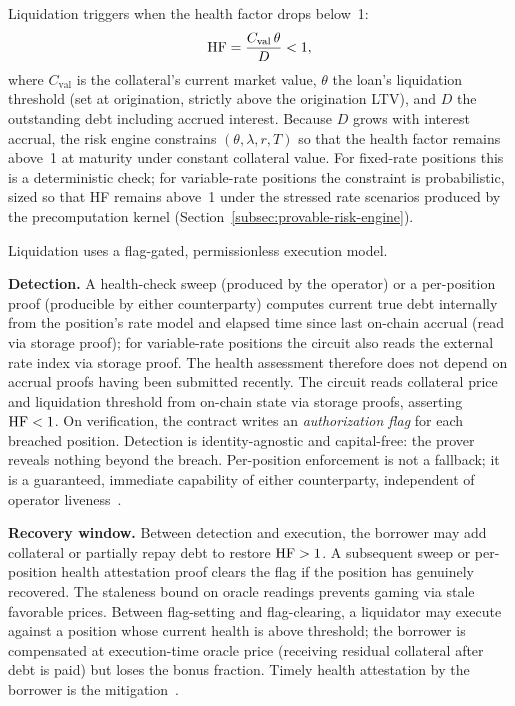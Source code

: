 Liquidation triggers when the health factor drops below~1:
\begin{equation}
  \mathrm{HF} = \frac{C_{\mathrm{val}}\,\theta}{D} < 1,
  \label{eq:healthfactor}
\end{equation}
where $C_{\mathrm{val}}$ is the collateral's current market value, $\theta$ the loan's liquidation threshold (set at origination, strictly above the origination LTV), and $D$ the outstanding debt including accrued interest. Because $D$ grows with interest accrual, the risk engine constrains $(\theta, \lambda, r, T)$ so that the health factor remains above~1 at maturity under constant collateral value. For fixed-rate positions this is a deterministic check; for variable-rate positions the constraint is probabilistic, sized so that HF remains above~1 under the stressed rate scenarios produced by the precomputation kernel (Section~\ref{subsec:provable-risk-engine}).

Liquidation uses a flag-gated, permissionless execution model.

\textbf{Detection.} A health-check sweep (produced by the operator) or a per-position proof (producible by either counterparty) computes current true debt internally from the position's rate model and elapsed time since last on-chain accrual (read via storage proof); for variable-rate positions the circuit also reads the external rate index via storage proof. The health assessment therefore does not depend on accrual proofs having been submitted recently. The circuit reads collateral price and liquidation threshold from on-chain state via storage proofs, asserting $\mathrm{HF} < 1$. On verification, the contract writes an \emph{authorization flag} for each breached position. Detection is identity-agnostic and capital-free: the prover reveals nothing beyond the breach. Per-position enforcement is not a fallback; it is a guaranteed, immediate capability of either counterparty, independent of operator liveness~\cite{daloc-decent2026}.

\textbf{Recovery window.} Between detection and execution, the borrower may add collateral or partially repay debt to restore $\mathrm{HF} > 1$. A subsequent sweep or per-position health attestation proof clears the flag if the position has genuinely recovered. The staleness bound on oracle readings prevents gaming via stale favorable prices. Between flag-setting and flag-clearing, a liquidator may execute against a position whose current health is above threshold; the borrower is compensated at execution-time oracle price (receiving residual collateral after debt is paid) but loses the bonus fraction. Timely health attestation by the borrower is the mitigation~\cite{daloc-decent2026}.

